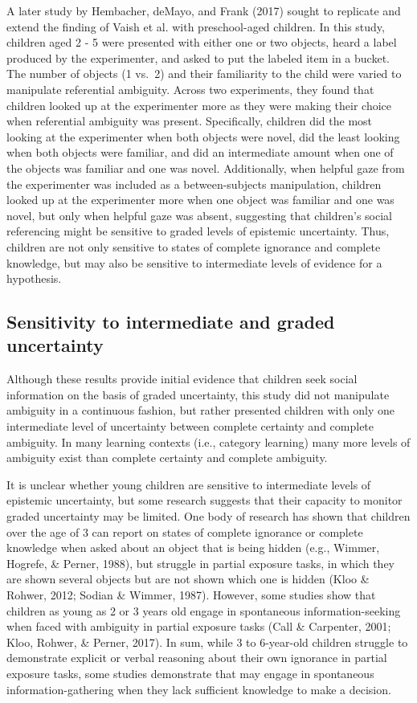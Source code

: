\documentclass[floatsintext,man]{apa6}
\theoremstyle{definition}
\theoremstyle{definition}
\theoremstyle{definition}
\theoremstyle{remark}
\begin{document}
A later study by Hembacher, deMayo, and Frank (2017) sought to replicate
and extend the finding of Vaish et al. with preschool-aged children. In
this study, children aged 2 - 5 were presented with either one or two
objects, heard a label produced by the experimenter, and asked to put
the labeled item in a bucket. The number of objects (1 vs.~2) and their
familiarity to the child were varied to manipulate referential
ambiguity. Across two experiments, they found that children looked up at
the experimenter more as they were making their choice when referential
ambiguity was present. Specifically, children did the most looking at
the experimenter when both objects were novel, did the least looking
when both objects were familiar, and did an intermediate amount when one
of the objects was familiar and one was novel. Additionally, when
helpful gaze from the experimenter was included as a between-subjects
manipulation, children looked up at the experimenter more when one
object was familiar and one was novel, but only when helpful gaze was
absent, suggesting that children's social referencing might be sensitive
to graded levels of epistemic uncertainty. Thus, children are not only
sensitive to states of complete ignorance and complete knowledge, but
may also be sensitive to intermediate levels of evidence for a
hypothesis.

\subsection{Sensitivity to intermediate and graded
uncertainty}\label{sensitivity-to-intermediate-and-graded-uncertainty}

Although these results provide initial evidence that children seek
social information on the basis of graded uncertainty, this study did
not manipulate ambiguity in a continuous fashion, but rather presented
children with only one intermediate level of uncertainty between
complete certainty and complete ambiguity. In many learning contexts
(i.e., category learning) many more levels of ambiguity exist than
complete certainty and complete ambiguity.

It is unclear whether young children are sensitive to intermediate
levels of epistemic uncertainty, but some research suggests that their
capacity to monitor graded uncertainty may be limited. One body of
research has shown that children over the age of 3 can report on states
of complete ignorance or complete knowledge when asked about an object
that is being hidden (e.g., Wimmer, Hogrefe, \& Perner, 1988), but
struggle in partial exposure tasks, in which they are shown several
objects but are not shown which one is hidden (Kloo \& Rohwer, 2012;
Sodian \& Wimmer, 1987). However, some studies show that children as
young as 2 or 3 years old engage in spontaneous information-seeking when
faced with ambiguity in partial exposure tasks (Call \& Carpenter, 2001;
Kloo, Rohwer, \& Perner, 2017). In sum, while 3 to 6-year-old children
struggle to demonstrate explicit or verbal reasoning about their own
ignorance in partial exposure tasks, some studies demonstrate that may
engage in spontaneous information-gathering when they lack sufficient
knowledge to make a decision.
\end{document}
